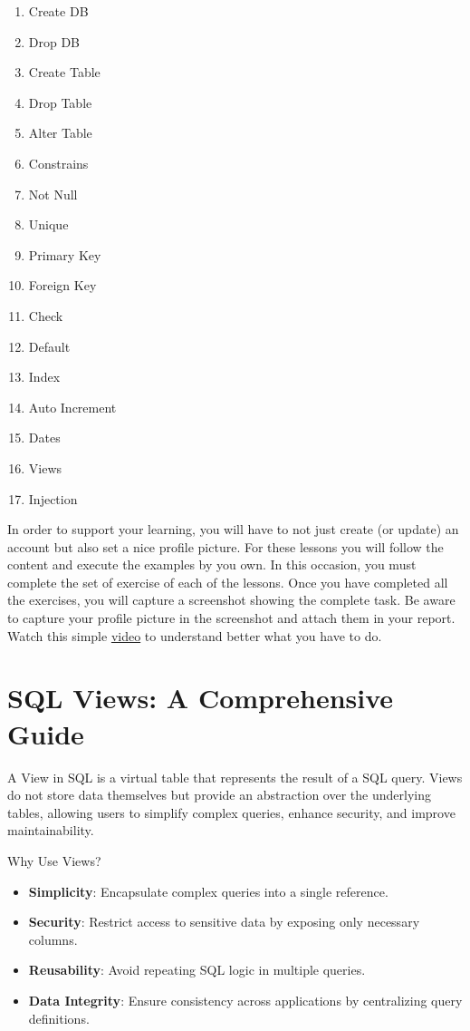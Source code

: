 \documentclass{article}
\begin{document}
\begin{enumerate}
  \item Create DB
  \item Drop DB
  \item Create Table
  \item Drop Table
  \item Alter Table
  \item Constrains
  \item Not Null
  \item Unique
  \item Primary Key
  \item Foreign Key
  \item Check
  \item Default
  \item Index
  \item Auto Increment
  \item Dates
  \item Views
  \item Injection
\end{enumerate}

In order to support your learning, you will have to not just create (or update) an account but also set a nice profile picture.  For these lessons you will follow the content and execute the examples by you own.  In this occasion, you must complete the set of exercise of each of the lessons.  Once you have completed all the exercises, you will capture a screenshot showing the complete task.  Be aware to capture your profile picture in the screenshot and attach them in your report.  Watch this simple \href{https://drive.google.com/file/d/1cMssK6Az56eU3QyCk4hMVr6DfQ9nRsv7/view?usp=sharing}{video} to understand better what you have to do.

\section{SQL Views: A Comprehensive Guide}

A View in SQL is a virtual table that represents the result of a SQL query. Views do not store data themselves but provide an abstraction over the underlying tables, allowing users to simplify complex queries, enhance security, and improve maintainability.

Why Use Views?
\begin{itemize}
  \item \textbf{Simplicity}: Encapsulate complex queries into a single reference.
  \item \textbf{Security}: Restrict access to sensitive data by exposing only necessary columns.
  \item \textbf{Reusability}: Avoid repeating SQL logic in multiple queries.
  \item \textbf{Data Integrity}: Ensure consistency across applications by centralizing query definitions.
\end{itemize}
\end{document}
